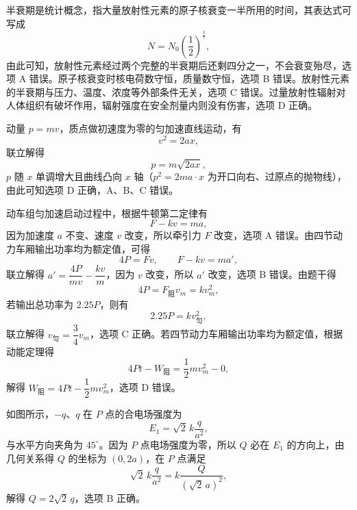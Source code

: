 
\begin{answer}
半衰期是统计概念，指大量放射性元素的原子核衰变一半所用的时间，其表达式可写成
\[
  N=N_{0}\left(\frac{1}{2}\right)^{\frac{t}{\tau}},
\]
由此可知，放射性元素经过两个完整的半衰期后还剩四分之一，不会衰变殆尽，选项 A 错误。原子核衰变时核电荷数守恒，质量数守恒，选项 B 错误。放射性元素的半衰期与压力、温度、浓度等外部条件无关，选项 C 错误。过量放射性辐射对人体组织有破坏作用，辐射强度在安全剂量内则没有伤害，选项 D 正确。
\end{answer}

\begin{answer}
动量 $p=mv$，质点做初速度为零的匀加速直线运动，有
\[
  v^{2}=2ax,
\]
联立解得
\[
  p=m\sqrt{2ax},
\]
$p$ 随 $x$ 单调增大且曲线凸向 $x$ 轴（$p^{2}=2ma\cdot x$ 为开口向右、过原点的抛物线），由此可知选项 D 正确，A、B、C 错误。
\end{answer}

\begin{answer}
动车组匀加速启动过程中，根据牛顿第二定律有
\[
  F-kv=ma,
\]
因为加速度 $a$ 不变、速度 $v$ 改变，所以牵引力 $F$ 改变，选项 A 错误。由四节动力车厢输出功率均为额定值，可得
\[
  4P=Fv,\qquad F-kv=ma',
\]
联立解得 $a'=\dfrac{4P}{mv}-\dfrac{kv}{m}$，因为 $v$ 改变，所以 $a'$ 改变，选项 B 错误。由题干得
\[
  4P=F_{\text{阻}}v_{m}=kv_{m}^{2},
\]
若输出总功率为 $2.25P$，则有
\[
  2.25P=kv_{\text{匀}}^{2},
\]
联立解得 $v_{\text{匀}}=\dfrac{3}{4}v_{m}$，选项 C 正确。若四节动力车厢输出功率均为额定值，根据动能定理得
\[
  4Pt-W_{\text{阻}}=\frac{1}{2}mv_{m}^{2}-0,
\]
解得 $W_{\text{阻}}=4Pt-\dfrac{1}{2}mv_{m}^{2}$，选项 D 错误。
\end{answer}

\begin{answer}
如图所示，$-q$、$q$ 在 $P$ 点的合电场强度为
\[
  E_{1}=\sqrt{2}\,k\frac{q}{a^{2}},
\]
与水平方向夹角为 $45^{\circ}$。因为 $P$ 点电场强度为零，所以 $Q$ 必在 $E_{1}$ 的方向上，由几何关系得 $Q$ 的坐标为 $(0,2a)$，在 $P$ 点满足
\[
  \sqrt{2}\,k\frac{q}{a^{2}}=k\frac{Q}{(\sqrt{2}\,a)^{2}},
\]
解得 $Q=2\sqrt{2}\,q$，选项 B 正确。

\end{answer}

